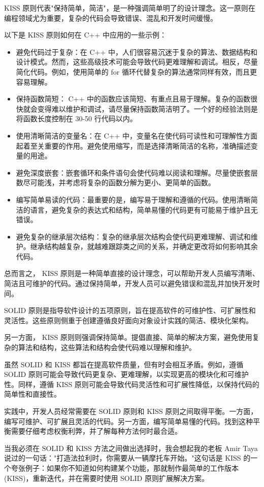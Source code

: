KISS 原则代表"保持简单，简洁"，是一种强调简单明了的设计理念。这一原则在编程领域尤为重要，复杂的代码会导致错误、混乱和开发时间缓慢。

以下是 KISS 原则如何在 C++ 中应用的一些示例：

\begin{itemize}
\item
避免代码过于复杂：在 C++ 中，人们很容易沉迷于复杂的算法、数据结构和设计模式。然而，这些高级技术可能会导致代码更难理解和调试。相反，尽量简化代码。例如，使用简单的 for 循环代替复杂的算法通常同样有效，而且更容易理解。

\item
保持函数简短： C++ 中的函数应该简短、有重点且易于理解。复杂的函数很快就会变得难以维护和调试，请尽量保持函数简洁明了。一个好的经验法则是将函数长度控制在 30-50 行代码以内。

\item
使用清晰简洁的变量名：在 C++ 中，变量名在使代码可读性和可理解性方面起着至关重要的作用。避免使用缩写，而是选择清晰简洁的名称，准确描述变量的用途。

\item
避免深度嵌套：嵌套循环和条件语句会使代码难以阅读和理解。尽量使嵌套层数尽可能浅，并考虑将复杂的函数分解为更小、更简单的函数。

\item
编写简单易读的代码：最重要的是，编写易于理解和遵循的代码。使用清晰简洁的语言，避免复杂的表达式和结构，简单易懂的代码更有可能易于维护且无错误。

\item
避免复杂的继承层次结构：复杂的继承层次结构会使代码更难理解、调试和维护。继承结构越复杂，就越难跟踪类之间的关系，并确定更改将如何影响其余代码。
\end{itemize}

总而言之， KISS 原则是一种简单直接的设计理念，可以帮助开发人员编写清晰、简洁且可维护的代码。通过保持简单，开发人员可以避免错误和混乱并加快开发时间。


SOLID 原则是指导软件设计的五项原则，旨在提高软件的可维护性、可扩展性和灵活性。这些原则侧重于创建遵循良好面向对象设计实践的简洁、模块化架构。

另一方面， KISS 原则则强调保持简单。提倡直接、简单的解决方案，避免使用复杂的算法和结构，这些算法和结构会使代码难以理解和维护。

虽然 SOLID 和 KISS 都旨在提高软件质量，但有时会相互矛盾。例如，遵循 SOLID 原则可能会导致代码更复杂、更难理解，以实现更高的模块化和可维护性。同样，遵循 KISS 原则可能会导致代码灵活性和可扩展性降低，以保持代码的简单性和直接性。

实践中，开发人员经常需要在 SOLID 原则和 KISS 原则之间取得平衡。一方面，编写可维护、可扩展且灵活的代码。另一方面，编写简单易懂的代码。找到这种平衡需要仔细考虑权衡利弊，并了解每种方法何时最合适。

当我必须在 SOLID 和 KISS 方法之间做出选择时，我会想起我的老板 Amir Taya 说过的一句话："打造法拉利时，你需要从一辆摩托车开始。"这句话是 KISS 的一个夸张例子：如果你不知道如何构建某个功能，那就制作最简单的工作版本 (KISS)，重新迭代，并在需要时使用 SOLID 原则扩展解决方案。









